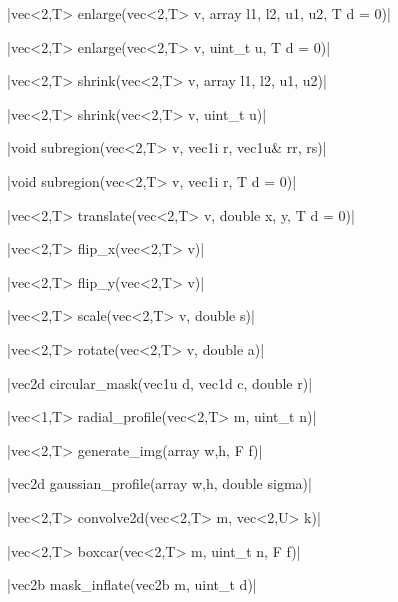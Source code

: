 \funcitem \cppinline|vec<2,T> enlarge(vec<2,T> v, array {l1, l2, u1, u2}, T d = 0)| 

\cppinline|vec<2,T> enlarge(vec<2,T> v, uint_t u, T d = 0)|

\funcitem \cppinline|vec<2,T> shrink(vec<2,T> v, array {l1, l2, u1, u2})| 

\cppinline|vec<2,T> shrink(vec<2,T> v, uint_t u)|

\funcitem \cppinline|void subregion(vec<2,T> v, vec1i r, vec1u& rr, rs)| 

\cppinline|void subregion(vec<2,T> v, vec1i r, T d = 0)|

\funcitem \cppinline|vec<2,T> translate(vec<2,T> v, double x, y, T d = 0)| 

\funcitem \cppinline|vec<2,T> flip_x(vec<2,T> v)| 

\funcitem \cppinline|vec<2,T> flip_y(vec<2,T> v)| 

\funcitem \cppinline|vec<2,T> scale(vec<2,T> v, double s)| 

\funcitem \cppinline|vec<2,T> rotate(vec<2,T> v, double a)| 

\funcitem \cppinline|vec2d circular_mask(vec1u d, vec1d c, double r)| 

\funcitem \cppinline|vec<1,T> radial_profile(vec<2,T> m, uint_t n)| 

\funcitem \cppinline|vec<2,T> generate_img(array {w,h}, F f)| 

\funcitem \cppinline|vec2d gaussian_profile(array {w,h}, double sigma)| 

\funcitem \cppinline|vec<2,T> convolve2d(vec<2,T> m, vec<2,U> k)| 

\funcitem \cppinline|vec<2,T> boxcar(vec<2,T> m, uint_t n, F f)| 

\funcitem \cppinline|vec2b mask_inflate(vec2b m, uint_t d)| 
